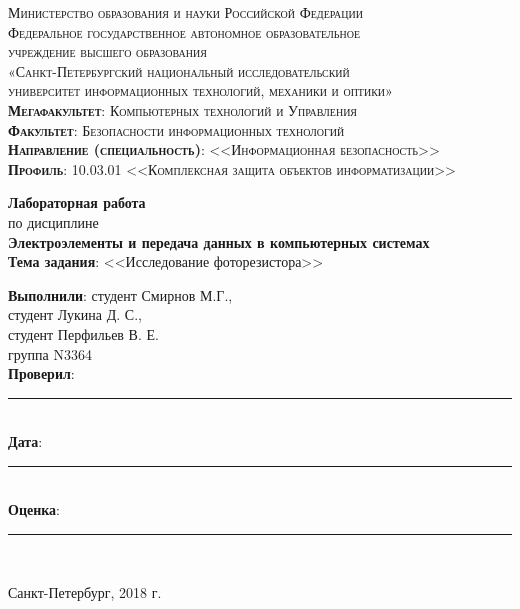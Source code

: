 \begin{titlepage}
	\begin{center}
		\textsc{
			\fontsize{12pt}{14pt}\selectfont
			Министерство образования и науки Российской Федерации\\
			Федеральное государственное автономное образовательное\\
			учреждение высшего образования\\
			«Санкт-Петербургский национальный исследовательский\\
			университет информационных технологий, механики и оптики»\\
			\textbf{Мегафакультет}:  Компьютерных технологий и Управления\\
			\textbf{Факультет}: Безопасности информационных технологий\\
			\textbf{Направление (специальность)}: <<Информационная безопасность>>\\
			\textbf{Профиль}: 10.03.01 <<Комплексная защита объектов информатизации>>}
		
		\vfill
		
		\textbf{Лабораторная работа}\\
		по дисциплине\\
		\textbf{Электроэлементы и передача данных в компьютерных системах}\\
	\vfill
	\textbf{Тема задания}: <<Исследование фоторезистора>>\\
	\end{center}

	\vfill
	
	\begin{flushright}
	\textbf{Выполнили}: студент Смирнов М.Г., \\
	студент Лукина Д. С., \\
	студент Перфильев В. Е. \\
	группа N3364\\
	\textbf{Проверил}: \rule{10em}{.1pt}\\
		\vfill
	\textbf{Дата}: \rule{10em}{.1pt}\\
	\textbf{Оценка}: \rule{10em}{.1pt}\\

	\vfill
	


	\end{flushright}
	\vfill
	\begin{center}
		Санкт-Петербург, 2018 г.
	\end{center}
\end{titlepage}
